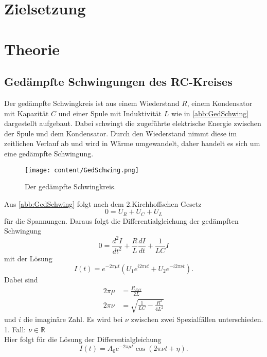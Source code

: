 \section{Zielsetzung}
\label{sec:Zielsetzung}
\section{Theorie}
\label{sec:Theorie}
\subsection{Gedämpfte Schwingungen des RC-Kreises}
Der gedämpfte Schwingkreis ist aus einem Wiederstand $R$, einem Kondensator mit Kapazität $C$ und
einer Spule mit Induktivität $L$ wie in \autoref{abb:GedSchwing} dargestellt aufgebaut. Dabei schwingt
die zugeführte elektrische Energie zwischen der Spule und dem Kondensator. Durch den Wiederstand nimmt diese im zeitlichen
Verlauf ab und wird in Wärme umgewandelt, daher handelt es sich um eine gedämpfte Schwingung.
\begin{figure}[H]
    \centering
    \texttt{[image: content/GedSchwing.png]}
    \caption{Der gedämpfte Schwingkreis. \cite{sample}}
    \label{abb:GedSchwing}
\end{figure}
\noindent Aus \autoref{abb:GedSchwing} folgt nach dem 2.Kirchhoffschen Gesetz
\begin{equation*}
    0 = U_R + U_C + U_L
\end{equation*}
für die Spannungen.
Daraus folgt die Differentialgleichung der gedämpften Schwingung
\begin{equation*}
    0 = \frac{d^2 I}{dt^2} + \frac{R}{L}\frac{dI}{dt} + \frac{1}{LC}I
\end{equation*}
mit der Lösung
\begin{equation}
    \label{eqn:AllgLoes}
    I(t) = e^{-2\pi\mu t}\left(U_1e^{i2\pi\nu t} + U_2e^{-i2\pi\nu t}\right).
\end{equation}
Dabei sind
\begin{align}
   2\pi\mu &= \frac{R_{Eff}}{2L}\\
   2\pi\nu &= \sqrt{\frac{1}{LC} - \frac{R^2}{4L^2}}
\end{align}
und $i$ die imaginäre Zahl.
Es wird bei $\nu$ zwischen zwei Spezialfällen unterschieden.\\
1. Fall: $\nu\in\mathbb{R}$\\
Hier folgt für die Lösung der Differentialgleichung
\begin{equation}
    I(t) = A_0e^{-2\pi\mu t}\cos(2\pi\nu t + \eta).
\end{equation}
